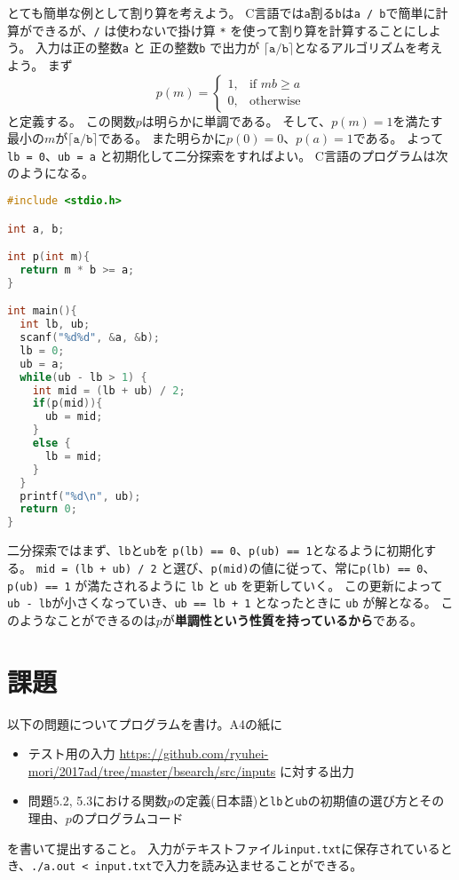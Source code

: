 \documentclass[a4paper,twoside,onecolumn,openany,article,10pt]{memoir}
\theoremstyle{remark}
\begin{document}
とても簡単な例として割り算を考えよう。
C言語では\texttt{a}割る\texttt{b}は\texttt{a / b}で簡単に計算ができるが、\texttt{/} は使わないで掛け算 \texttt{*} を使って割り算を計算することにしよう。
入力は正の整数\texttt{a} と 正の整数\texttt{b} で出力が $\mathtt{\lceil a / b \rceil}$となるアルゴリズムを考えよう。
まず
\begin{equation*}
p(m)=
\begin{cases}
1, & \text{if } mb \ge a\\
0, & \text{otherwise}
\end{cases}
\end{equation*}
と定義する。
この関数$p$は明らかに単調である。
そして、$p(m)=1$を満たす最小の$m$が$\mathtt{\lceil  a / b \rceil}$である。
また明らかに$p(0)=0$、$p(a)=1$である。
よって\texttt{lb = 0}、\texttt{ub = a} と初期化して二分探索をすればよい。
C言語のプログラムは次のようになる。

\begin{lstlisting}[basicstyle=\ttfamily\small,showstringspaces=false,language=C,frame=single]
#include <stdio.h>

int a, b;

int p(int m){
  return m * b >= a;
}

int main(){
  int lb, ub;
  scanf("%d%d", &a, &b);
  lb = 0;
  ub = a;
  while(ub - lb > 1) {
    int mid = (lb + ub) / 2;
    if(p(mid)){
      ub = mid;
    }
    else {
      lb = mid;
    }
  }
  printf("%d\n", ub);
  return 0;
}
\end{lstlisting}

二分探索ではまず、\texttt{lb}と\texttt{ub}を \texttt{p(lb) == 0}、\texttt{p(ub) == 1}となるように初期化する。
\texttt{mid = (lb + ub) / 2} と選び、\texttt{p(mid)}の値に従って、常に\texttt{p(lb) == 0}、\texttt{p(ub) == 1} が満たされるように \texttt{lb} と \texttt{ub} を更新していく。
この更新によって\texttt{ub - lb}が小さくなっていき、\texttt{ub == lb + 1} となったときに \texttt{ub} が解となる。
このようなことができるのは$p$が\textbf{単調性という性質を持っているから}である。

\clearpage
\section{課題}\label{sec:assign}
以下の問題についてプログラムを書け。A4の紙に
\begin{itemize}
\item テスト用の入力 \url{https://github.com/ryuhei-mori/2017ad/tree/master/bsearch/src/inputs} に対する出力
\item 問題5.2, 5.3における関数$p$の定義(日本語)と\texttt{lb}と\texttt{ub}の初期値の選び方とその理由、$p$のプログラムコード
\end{itemize}
を書いて提出すること。
入力がテキストファイル\texttt{input.txt}に保存されているとき、\texttt{./a.out < input.txt}で入力を読み込ませることができる。
\end{document}
